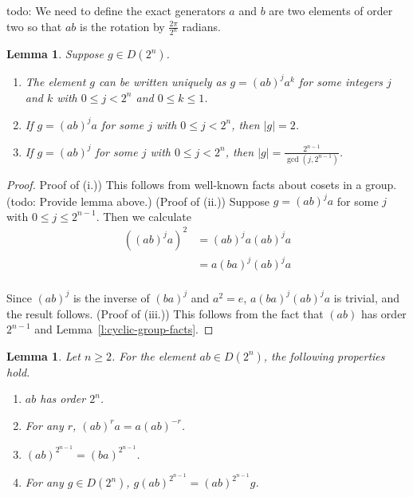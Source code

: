 \documentclass{amsart}
\numberwithin{equation} {section}
\newtheorem{lemma}[equation]{Lemma}
\theoremstyle{definition}
\begin{document}
todo: We need to define the exact generators $a$ and $b$ are two elements of order two so that $ab$ is the rotation by $\displaystyle\frac{2\pi}{2^n}$ radians. 


\begin{lemma}\label{l:normal-form}
Suppose $g \in D(2^n)$. 
\begin{enumerate}
\item[(i.)] The element $g$ can be written uniquely as $g = (ab)^ja^k$ for some integers $j$ and $k$ with $0 \leq j < 2^{n}$ and $0 \leq k \leq 1$. 
\item[(ii.)] If $g = (ab)^ja$ for some $j$ with $0 \leq j < 2^{n}$, then $|g| = 2$. 
\item[(iii.)] If $g = (ab)^j$ for some $j$ with $0 \leq j < 2^{n}$, then $|g| = \displaystyle\frac{2^{n-1}}{\gcd(j,2^{n-1})}$. 
\end{enumerate}
\end{lemma}

\begin{proof}
Proof of (i.)) This follows from well-known facts about cosets in a group. (todo: Provide lemma above.) 
(Proof of (ii.)) Suppose $g = (ab)^ja$ for some $j$ with $0 \leq j \leq 2^{n-1}$. Then we calculate
\begin{align*}
((ab)^j a)^2 &= (ab)^j a (ab)^j a \\
&= a (ba)^j (ab)^j a \\
\end{align*}

Since $(ab)^j$ is the inverse of $(ba)^j$ and $a^2 = e$,  $a (ba)^j (ab)^j a$ is trivial, and the result follows. (Proof of (iii.)) This follows from the fact that $(ab)$ has order $2^{n-1}$ and Lemma~\ref{l:cyclic-group-facts}.
\end{proof}


\begin{lemma}\label{l:ab-order-lemma}
Let $n \geq 2$. For the element $ab \in D(2^n)$, the following properties hold. 
\begin{enumerate}
\item[(i.)] $ab$ has order $2^{n}$.
\item[(ii.)] For any $r$, $(ab)^{r}a = a(ab)^{-r}$. 
\item[(iii.)] $(ab)^{2^{n-1}} = (ba)^{2^{n-1}}$. 
\item[(iv.)] For any $g \in D(2^n)$, $g (ab)^{2^{n-1}} = (ab)^{2^{n-1}} g$. 
\end{enumerate}
\end{lemma}
\end{document}
